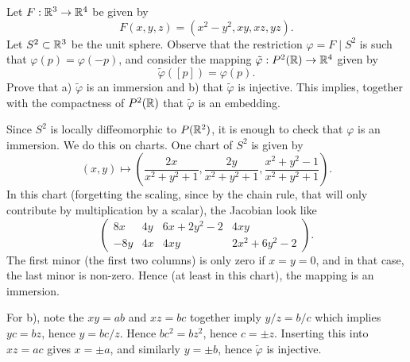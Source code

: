 \documentclass[11pt, english]{article}
\begin{document}
\begin{exc}

Let $F:\mathbb{R}^3 \to \mathbb{R}^4$ be given by
\[
F(x,y,z) = (x^2-y^2, xy,xz,yz).
\]  
Let $S^2 \subset \mathbb{R}^3$ be the unit sphere. Observe that the restriction $\varphi = F\mid S^2$ is such that $\varphi(p) = \varphi(-p)$, and consider the mapping $\tilde \varphi: P^2(\mathbb{R}) \to \mathbb{R}^4$ given by
\[
\tilde \varphi([p]) = \varphi(p).
\]
Prove that a) $\tilde \varphi$ is an immersion and b) that $\tilde \varphi$ is injective. This implies, together with the compactness of $P^2(\mathbb{R})$ that $\tilde \varphi$ is an embedding.
\end{exc}
\begin{sol}
Since $S^2$ is locally diffeomorphic to $P(\mathbb{R}^2)$, it is enough to check that $\varphi$ is an immersion. We do this on charts. One chart of $S^2$ is given by
\[
(x,y) \mapsto \left( \frac{2x}{x^2+y^2+1}, \frac{2y}{x^2+y^2+1}, \frac{x^2+y^2-1}{x^2+y^2+1} \right).
\]
In this chart (forgetting the scaling, since by the chain rule, that will only contribute by multiplication by a scalar), the Jacobian look like
\[
\begin{pmatrix}
  8x & 4y & 6x+2y^2-2 & 4xy \\
-8y & 4x & 4xy & 2x^2+6y^2-2
\end{pmatrix}.
\]
The first minor (the first two columns) is only zero if $x=y=0$, and in that case, the last minor is non-zero. Hence (at least in this chart), the mapping is an immersion.

For b), note the $xy=ab$ and $xz=bc$ together imply $y/z=b/c$ which implies $yc=bz$, hence $y=bc/z$. Hence $bc^2=bz^2$, hence $c = \pm z$. Inserting this into $xz=ac$ gives $x=\pm a$, and similarly $y=\pm b$, hence $\tilde \varphi$ is injective.
\end{sol}
\end{document}
